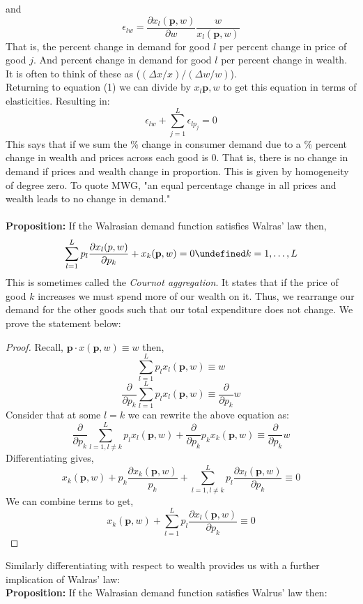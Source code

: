 \documentclass[12pt]{article}
\let\oldforall\forall
\let\forall\undefined
\let\bf\oldbf
\let\bf\textbf
\DeclareMathOperator{\forall}{\,\oldforall\,}
\begin{document}
and
$$\epsilon_{lw} = \frac{\partial x_l(\bf{p}, w)}{\partial w}\frac{w}{x_l(\bf{p}, w)}$$
That is, the percent change in demand for good $l$ per percent change in price of good $j$. And percent change in demand for good $l$ per percent change in wealth. It is often to think of these as ($(\Delta x/x)/(\Delta w/w)$).
\\ Returning to equation (1) we can divide by $x_l{\bf{p}, w}$ to get this equation in terms of elasticities. Resulting in:
\begin{equation}\epsilon_{lw} + \sum^L_{j = 1}\epsilon_{lp_j} = 0\end{equation}
This says that if we sum the \% change in consumer demand due to a \% percent change in wealth and prices across each good is 0. That is, there is no change in demand if prices and wealth change in proportion. This is given by homogeneity of degree zero. To quote MWG, "an equal percentage change in all prices and wealth leads to no change in demand."
\\ \bf{\\Proposition:} If the Walrasian demand function satisfies Walras' law then,
\begin{equation}
\sum^L_{l=1}p_l\frac{\partial x_l(p,w)}{\partial p_k} + x_k(\bf{p}, w) = 0 \forall k = 1,\dots,L
\end{equation}
This is sometimes called the \emph{Cournot aggregation}. It states that if the price of good $k$ increases we must spend more of our wealth on it. Thus, we rearrange our demand for the other goods such that our total expenditure does not change. We prove the statement below:
\begin{proof}
Recall, $\bf{p}\cdot x(\bf{p}, w) \equiv w$ then,
$$\sum^L_{l=1}p_lx_l(\bf{p},w) \equiv w$$
$$\frac{\partial}{\partial p_k}\sum^L_{l=1}p_lx_l(\bf{p},w) \equiv \frac{\partial}{\partial p_k}w$$
Consider that at some $l = k$ we can rewrite the above equation as:
$$\frac{\partial}{\partial p_k}\sum^L_{l=1, l\not=k}p_lx_l(\bf{p},w) + \frac{\partial}{\partial p_k}p_kx_k(\bf{p},w)\equiv \frac{\partial}{\partial p_k}w$$
Differentiating gives,
$$x_k(\bf{p}, w) + p_k\frac{\partial x_k(\bf{p}, w)}{p_k} + \sum^L_{l=1, l\not= k}p_l\frac{\partial x_l(\bf{p},w)}{\partial p_k} \equiv 0$$
We can combine terms to get,
$$x_k(\bf{p}, w) + \sum^L_{l=1}p_l\frac{\partial x_l(\bf{p},w)}{\partial p_k} \equiv 0$$
\end{proof}
Similarly differentiating with respect to wealth provides us with a further implication of Walras' law:
\\ \bf{Proposition:} If the Walrasian demand function satisfies Walrus' law then: 
\end{document}
